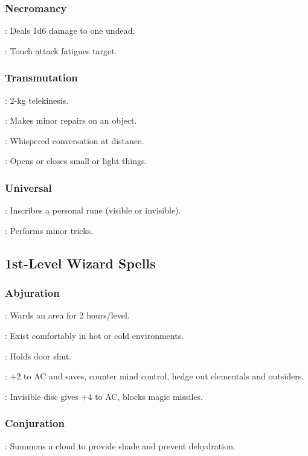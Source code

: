 \subsubsection{Necromancy}
	: Deals 1d6 damage to one undead.

	: Touch attack fatigues target.

\subsubsection{Transmutation}
	: 2-kg telekinesis.

	: Makes minor repairs on an object.

	: Whispered conversation at distance.

	: Opens or closes small or light things.

\subsubsection{Universal}
	: Inscribes a personal rune (visible or invisible).

	: Performs minor tricks.



\subsection{1st-Level Wizard Spells}

\subsubsection{Abjuration}
	: Wards an area for 2 hours/level.

	: Exist comfortably in hot or cold environments.

	: Holds door shut.

	: +2 to AC and saves, counter mind control, hedge out elementals and outsiders.

	: Invisible disc gives +4 to AC, blocks magic missiles.

\subsubsection{Conjuration}
	: Summons a cloud to provide shade and prevent dehydration.

